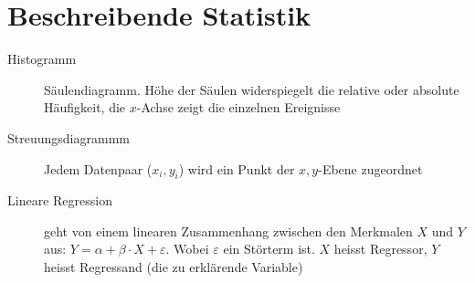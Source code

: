 \section{Beschreibende Statistik}
\begin{description}
	\item [Histogramm] Säulendiagramm. Höhe der Säulen widerspiegelt die relative oder absolute Häufigkeit, die $x$-Achse zeigt die einzelnen Ereignisse
	\item [Streuungsdiagrammm] Jedem Datenpaar ($x_i, y_i$) wird ein Punkt der $x, y$-Ebene zugeordnet
	\item [Lineare Regression] geht von einem linearen Zusammenhang zwischen den Merkmalen $X$ und $Y$ aus: $Y = \alpha + \beta\cdot X + \varepsilon$. Wobei $\varepsilon$ ein Störterm ist. $X$ heisst Regressor, $Y$ heisst Regressand (die zu erklärende Variable)
\end{description}

